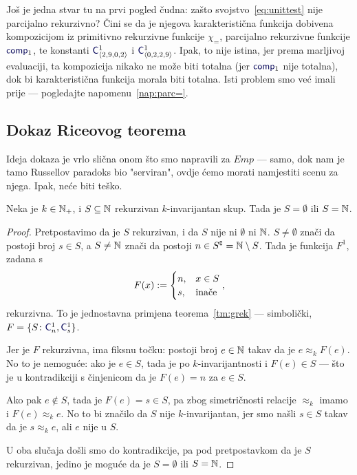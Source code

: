 Još je jedna stvar tu na prvi pogled čudna: zašto svojstvo~\eqref{eq:unittest} nije parcijalno rekurzivno? Čini se da je njegova karakteristična funkcija dobivena kompozicijom iz primitivno rekurzivne funkcije $\chi_=$, parcijalno rekurzivne funkcije $\f{comp}_1$, te konstanti $\f C^1_{\kr{2,9,0,2}}$ i $\f C^1_{\kr{0,2,2,9}}$. Ipak, to nije istina, jer prema marljivoj evaluaciji, ta kompozicija nikako ne može biti totalna (jer $\f{comp}_1$ nije totalna), dok bi karakteristična funkcija morala biti totalna. Isti problem smo već imali prije --- pogledajte napomenu~\ref{nap:parc=}.

\subsection{Dokaz Riceovog teorema}

Ideja dokaza je vrlo slična onom što smo napravili za $Emp$ --- samo, dok nam je tamo Russellov paradoks bio "serviran"\!, ovdje ćemo morati namjestiti scenu za njega. Ipak, neće biti teško.

\begin{teorem}\label{tm:Rice}
Neka je $k\in{\mathbb N}_+$, i $S\subseteq{\mathbb N}$ rekurzivan $k$-invarijantan skup. Tada je $S=\emptyset$ ili $S={\mathbb N}$.
\end{teorem}
\begin{proof}
Pretpostavimo da je $S$ rekurzivan, i da $S$ nije ni $\emptyset$ ni ${\mathbb N}$. $S\not=\emptyset$ znači da postoji broj $s\in S$, a $S\not={\mathbb N}$ znači da postoji $n\in S\sp{{\scriptscriptstyle\complement}}={\mathbb N}\setminus S$. Tada je funkcija $F^1$, zadana s
\begin{equation}
    F(x):=\begin{cases}
        n,&x\in S\\
        s,&\text{inače}
    \end{cases}\text,
\end{equation}
rekurzivna. To je jednostavna primjena teorema~\ref{tm:grek} --- simbolički, $F=\{S\colon\f C_n^1,\f C_s^1\}$.

Jer je $F$ rekurzivna, ima fiksnu točku: postoji broj $e\in{\mathbb N}$ takav da je $e\approx_k F(e)$. No to je nemoguće: ako je $e\in S$, tada je po $k$-invarijantnosti i $F(e)\in S$ --- što je u kontradikciji s činjenicom da je $F(e)=n$ za $e\in S$.

Ako pak $e\not\in S$, tada je $F(e)=s\in S$, pa zbog simetričnosti relacije $\approx_k$ imamo i $F(e)\approx_k e$. No to bi značilo da $S$ nije $k$-invarijantan, jer smo našli $s\in S$ takav da je $s\approx_k e$, ali $e$ nije u $S$.

U oba slučaja došli smo do kontradikcije, pa pod pretpostavkom da je $S$ rekurzivan, jedino je moguće da je $S=\emptyset$ ili $S={\mathbb N}$.
\end{proof}

